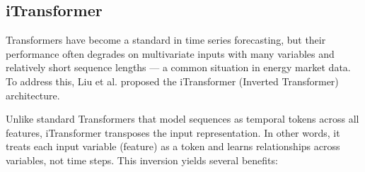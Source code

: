 \documentclass[class=scrbook, crop=false]{standalone}
\begin{document}





\subsection{iTransformer}
\label{Section::iTransformer}

Transformers have become a standard in time series forecasting, but their performance often degrades on multivariate inputs with many variables and relatively short sequence lengths — a common situation in energy market data. To address this, Liu et al. \cite{liuITransformerInvertedTransformers2023} proposed the iTransformer (Inverted Transformer) architecture.

Unlike standard Transformers that model sequences as temporal tokens across all features, iTransformer transposes the input representation. In other words, it treats each input variable (feature) as a token and learns relationships across variables, not time steps. This inversion yields several benefits:
\end{document}
